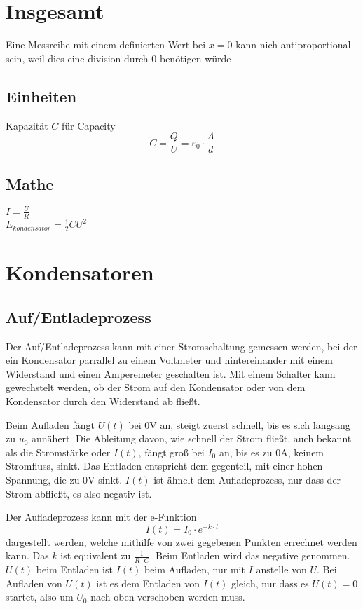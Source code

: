 \documentclass{article}
\begin{document}
 
\section{Insgesamt}
Eine Messreihe mit einem definierten Wert bei $x=0$ kann nich antiproportional sein, weil dies eine division durch 0 benötigen würde 
 
\subsection{Einheiten}
\noindent Kapazität $C$ für Capacity
\[C=\frac{Q}{U}=\varepsilon_0 \cdot \frac{A}{d}\]
 
\subsection{Mathe} 
$I=\frac{U}{R}$ \\
$E_{kondensator}=\frac{1}{2}CU^2$ 
 
\section{Kondensatoren}  
\subsection{Auf/Entladeprozess}
Der Auf/Entladeprozess kann mit einer Stromschaltung gemessen werden, bei der ein Kondensator parrallel zu einem Voltmeter und hintereinander mit einem Widerstand und einen Amperemeter geschalten ist. Mit einem Schalter kann gewechstelt werden, ob der Strom auf den Kondensator oder von dem Kondensator durch den Widerstand ab fließt. 
 
Beim Aufladen fängt $U(t)$ bei $0$V an, steigt zuerst schnell, bis es sich langsang zu $u_0$ annähert. Die Ableitung davon, wie schnell der Strom fließt, auch bekannt als die Stromstärke oder $I(t)$, fängt groß bei $I_0$ an, bis es zu $0$A, keinem Stromfluss, sinkt. Das Entladen entspricht dem gegenteil, mit einer hohen Spannung, die zu $0$V sinkt. $I(t)$ ist ähnelt dem Aufladeprozess, nur dass der Strom abfließt, es also negativ ist. 
 
Der Aufladeprozess kann mit der e-Funktion \[I(t)=I_0 \cdot e^{-k \cdot t}\] dargestellt werden, welche mithilfe von zwei gegebenen Punkten errechnet werden kann. 
Das $k$ ist equivalent zu $\frac{1}{R \cdot C}$.
Beim Entladen wird das negative genommen. $U(t)$ beim Entladen ist $I(t)$ beim Aufladen, nur mit $I$ anstelle von $U$. Bei Aufladen von $U(t)$ ist es dem Entladen von $I(t)$ gleich, nur dass es $U(t)=0$ startet, also um $U_0$ nach oben verschoben werden muss.
 
\end{document}
